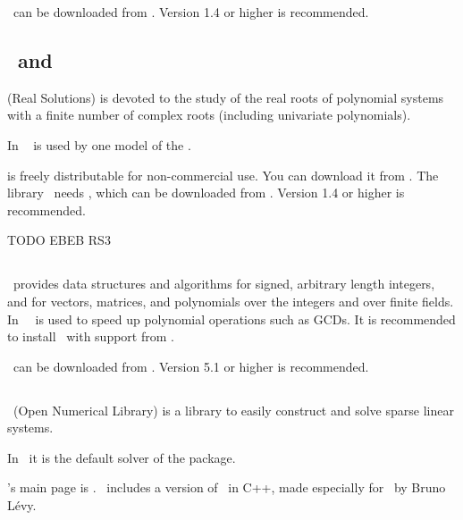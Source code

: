 \mpfi\ can be downloaded from \mpfipage. Version 1.4 or higher is recommended.

\subsection{\rs\ and \label{thirdparty:RS}\label{thirdparty:RS3}}

\rs{} (Real Solutions) is devoted to the study of the real
roots of polynomial systems with a finite number of complex roots
(including univariate polynomials). 

In \cgal\ \rs{} is used by one model of the .

\rs{} is freely distributable for non-commercial use. You can download it
from \rspage{}. The library \rs\ needs \mpfi, which can be downloaded from \mpfipage. 
Version 1.4 or higher is recommended.

TODO EBEB RS3

\subsection{\ntl \label{thirdparty:NTL}}

\ntl\ provides data structures and algorithms for signed, arbitrary
length integers, and for vectors, matrices, and polynomials over the 
integers and over finite fields. In \cgal\ \ntl\ is used to speed up
polynomial operations such as GCDs. It is recommended to install \ntl\
with support from \gmp.

\ntl\ can be downloaded from \ntlpage. Version 5.1 or higher is recommended.


\subsection{\opennl \label{thirdparty:OpenNL}}

\opennl\ (Open Numerical Library) is a library to easily construct and solve
sparse linear systems. 

In \cgal\ it is the default solver of the
 package.

\opennl's main page is \opennlpage.
\cgal\ includes a version of \opennl\ in C++, made especially for \cgal\ by Bruno L\'evy.

\subsection{\taucs \label{thirdparty:Taucs}}

